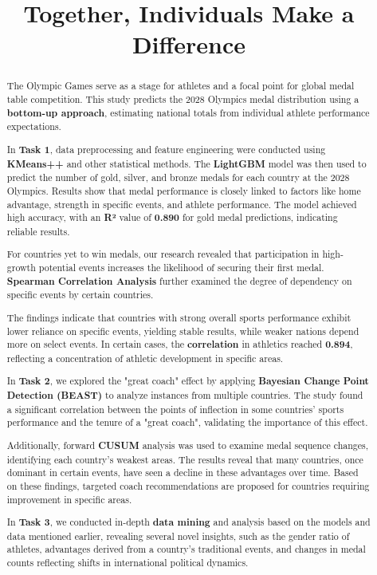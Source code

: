 \documentclass[12pt]{article}  %
\title{Together, Individuals Make a Difference}  %
\begin{document}
\begin{abstract}
	The Olympic Games serve as a stage for athletes and a focal point for global medal table competition. This study predicts the 2028 Olympics medal distribution using a \textbf{bottom-up approach}, estimating national totals from individual athlete performance expectations.
	
	In \textbf{Task 1}, data preprocessing and feature engineering were conducted using \textbf{KMeans++} and other statistical methods. The \textbf{LightGBM} model was then used to predict the number of gold, silver, and bronze medals for each country at the 2028 Olympics. Results show that medal performance is closely linked to factors like home advantage, strength in specific events, and athlete performance. The model achieved high accuracy, with an \textbf{R²} value of \textbf{0.890} for gold medal predictions, indicating reliable results.
	
	For countries yet to win medals, our research revealed that participation in high-growth potential events increases the likelihood of securing their first medal. \textbf{Spearman Correlation Analysis} further examined the degree of dependency on specific events by certain countries.
	
	The findings indicate that countries with strong overall sports performance exhibit lower reliance on specific events, yielding stable results, while weaker nations depend more on select events. In certain cases, the \textbf{correlation} in athletics reached \textbf{0.894}, reflecting a concentration of athletic development in specific areas.
	
	In \textbf{Task 2}, we explored the "great coach" effect by applying \textbf{Bayesian Change Point Detection (BEAST)} to analyze instances from multiple countries. The study found a significant correlation between the points of inflection in some countries' sports performance and the tenure of a "great coach", validating the importance of this effect.
	
	Additionally, forward \textbf{CUSUM} analysis was used to examine medal sequence changes, identifying each country's weakest areas. The results reveal that many countries, once dominant in certain events, have seen a decline in these advantages over time. Based on these findings, targeted coach recommendations are proposed for countries requiring improvement in specific areas.
	
	In \textbf{Task 3}, we conducted in-depth \textbf{data mining} and analysis based on the models and data mentioned earlier, revealing several novel insights, such as the gender ratio of athletes, advantages derived from a country's traditional events, and changes in medal counts reflecting shifts in international political dynamics.
	

\end{abstract}
\end{document}
